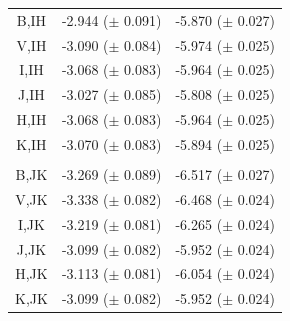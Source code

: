 \begin{table}
{\begin{tabular}{c c c}
	\\
	B,IH &  -2.944 ($\pm$ 0.091) & -5.870 ($\pm$ 0.027) \\
	V,IH &  -3.090 ($\pm$ 0.084) & -5.974 ($\pm$ 0.025) \\
	I,IH &  -3.068 ($\pm$ 0.083) & -5.964 ($\pm$ 0.025) \\
	J,IH &  -3.027 ($\pm$ 0.085) & -5.808 ($\pm$ 0.025) \\
	H,IH &  -3.068 ($\pm$ 0.083) & -5.964 ($\pm$ 0.025) \\
	K,IH &  -3.070 ($\pm$ 0.083) & -5.894 ($\pm$ 0.025) \\
	\\
	B,JK &  -3.269 ($\pm$ 0.089) & -6.517 ($\pm$ 0.027) \\
	V,JK &  -3.338 ($\pm$ 0.082) & -6.468 ($\pm$ 0.024) \\
	I,JK &  -3.219 ($\pm$ 0.081) & -6.265 ($\pm$ 0.024) \\
	J,JK &  -3.099 ($\pm$ 0.082) & -5.952 ($\pm$ 0.024) \\
	H,JK &  -3.113 ($\pm$ 0.081) & -6.054 ($\pm$ 0.024) \\
	K,JK &  -3.099 ($\pm$ 0.082) & -5.952 ($\pm$ 0.024) \\
	\hline
	\hline
	\end{tabular}
	}

\end{table}

